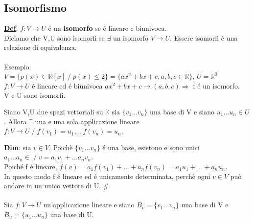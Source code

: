 \documentclass[12pt]{article}
\begin{document}
\subsection{Isomorfismo}
\textbf{\underline{Def}}: $f:V \longrightarrow U$ é un \textbf{isomorfo} se é lineare e biunivoca.\\
Diciamo che V,U sono isomorfi se $\exists$ un isomorfo $V\longrightarrow U$. Essere isomorfi é una relazione di equivalenza.\\\\
Esempio:\\
$V  =\{p(x) \in \mathbb{R}[x]\;/\; p(x) \leq 2\} = \{ax^2+bx+c,a,b,c \in \mathbb{R}\}$, $U=\mathbb{R}^3$\\
$f:V\longrightarrow U$ é lineare ed é biunivoca $ax^2 + bx + c \rightarrow (a,b,c) \Rightarrow$ f é un isomorfo.\\
V e U sono isomorfi.
\begin{theorem}
    
Siano V,U due spazi vettoriali su $\mathbb{K}$ sia $\{v_1...v_n\}$ una base di V e siano $u_1...u_n \in U$. Allora $\exists$ una e una sola applicazione lineare $f:V\longrightarrow U\;/\; f(v_1) = u_1,...f(v_n)=u_n$.
\label{appl lineare unica}
\end{theorem}

\noindent\textbf{Dim}: sia $v\in V$. Poichè $\{v_1...v_n\}$ é una base, esistono e sono unici $a_1...a_n \in \mathbb \;/\; v = a_1v_1+...a_nv_n$.\\
Poiché f è lineare, $f(v) = a_1f(v_1)+...+a_nf(v_n) = a_1u_1+...+a_nu_n.$\\
In questo modo f é lineare ed é unicamente determinata, perchè ogni $v \in V$ può andare in un unico vettore di U. $\#$\\\\
Sia $f:V\longrightarrow U$ un'applicazione lineare e siano $B_v = \{v_1...v_n\}$ una base di V e $B_u = \{u_1...u_n\}$ una base di U.
\end{document}
